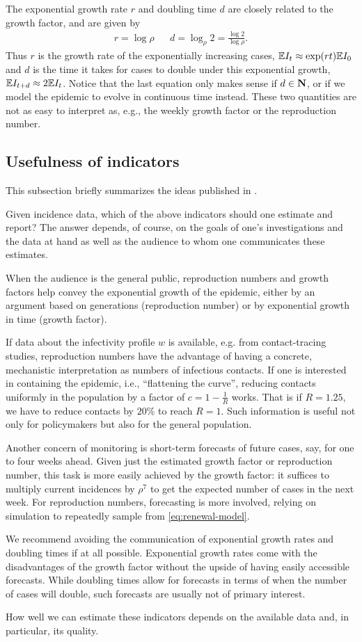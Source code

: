 The exponential growth rate $r$ and doubling time $d$ are closely related to the growth factor, and are given by 
\begin{align*}
    r = \log \rho && d = \log_{\rho} 2 = \frac{\log 2}{\log \rho}.
\end{align*}
Thus $r$ is the growth rate of the exponentially increasing cases, $\mathbb E I_{t} \approx \exp(rt) \mathbb E I_{0}$ and $d$ is the time it takes for cases to double under this exponential growth, $\mathbb E I_{t + d} \approx 2\mathbb E I_{t}$. Notice that the last equation only makes sense if $d \in \mathbf N$, or if we model the epidemic to evolve in continuous time instead. These two quantities are not as easy to interpret as, e.g., the weekly growth factor or the reproduction number. 

\subsection{Usefulness of indicators}
\label{subsec:usefulness_of_indicators}
This subsection briefly summarizes the ideas published in \citep{Heyder2023Measures}.

Given incidence data, which of the above indicators should one estimate and report? The answer depends, of course, on the goals of one's investigations and the data at hand as well as the audience to whom one communicates these estimates. 

When the audience is the general public, reproduction numbers and growth factors help convey the exponential growth of the epidemic, either by an argument based on generations (reproduction number) or by exponential growth in time (growth factor).

If data about the infectivity profile $w$ is available, e.g. from contact-tracing studies, reproduction numbers have the advantage of having a concrete, mechanistic interpretation as numbers of infectious contacts. If one is interested in containing the epidemic, i.e., ``{}flattening the curve''{}, reducing contacts uniformly in the population by a factor of $c = 1 - \frac{1}{R}$ works. That is if $R = 1.25$, we have to reduce contacts by $20\%$ to reach $R = 1$. Such information is useful not only for policymakers but also for the general population. 

Another concern of monitoring is short-term forecasts of future cases, say, for one to four weeks ahead. Given just the estimated growth factor or reproduction number, this task is more easily achieved by the growth factor: it suffices to multiply current incidences by $\rho^{7}$ to get the expected number of cases in the next week. For reproduction numbers, forecasting is more involved, relying on simulation to repeatedly sample from \eqref{eq:renewal-model}.

We recommend avoiding the communication of exponential growth rates and doubling times if at all possible. Exponential growth rates come with the disadvantages of the growth factor without the upside of having easily accessible forecasts. While doubling times allow for forecasts in terms of when the number of cases will double, such forecasts are usually not of primary interest. 

How well we can estimate these indicators depends on the available data and, in particular, its quality.
